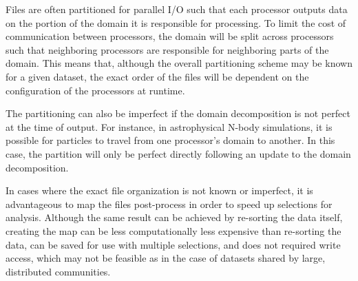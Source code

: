 \documentclass[apjl]{emulateapj}
\begin{document}
Files are often partitioned for parallel I/O such that each processor outputs data on the portion of the domain it is responsible for processing. To limit the cost of communication between processors, the domain will be split across processors such that neighboring processors are responsible for neighboring parts of the domain. This means that, although the overall partitioning scheme may be known for a given dataset, the exact order of the files will be dependent on the configuration of the processors at runtime. 

The partitioning can also be imperfect if the domain decomposition is not perfect at the time of output. For instance, in astrophysical N-body simulations, it is possible for particles to travel from one processor's domain to another. In this case, the partition will only be perfect directly following an update to the domain decomposition. 

In cases where the exact file organization is not known or imperfect, it is advantageous to map the files post-process in order to speed up selections for analysis. Although the same result can be achieved by re-sorting the data itself, creating the map can be less computationally less expensive than re-sorting the data, can be saved for use with multiple selections, and does not required write access, which may not be feasible as in the case of datasets shared by large, distributed communities.

\end{document}
